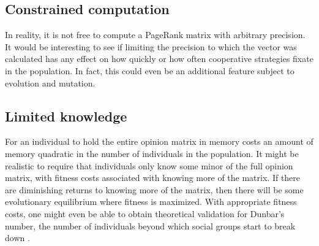 \documentclass{amsart}
\begin{document}
\subsection{Constrained computation}

In reality, it is not free to compute a PageRank matrix with arbitrary
precision. It would be interesting to see if limiting the precision to
which the vector was calculated has any effect on how quickly or how
often cooperative strategies fixate in the population. In fact, this
could even be an additional feature subject to evolution and mutation.

\subsection{Limited knowledge}

For an individual to hold the entire opinion matrix in memory costs an
amount of memory quadratic in the number of individuals in the
population. It might be realistic to require that individuals only
know some minor of the full opinion matrix, with fitness costs
associated with knowing more of the matrix. If there are diminishing
returns to knowing more of the matrix, then there will be some
evolutionary equilibrium where fitness is maximized. With appropriate
fitness costs, one might even be able to obtain theoretical validation
for Dunbar's number, the number of individuals beyond which social
groups start to break down \cite{dunbar_neocortex_1995}.

 
\end{document}
